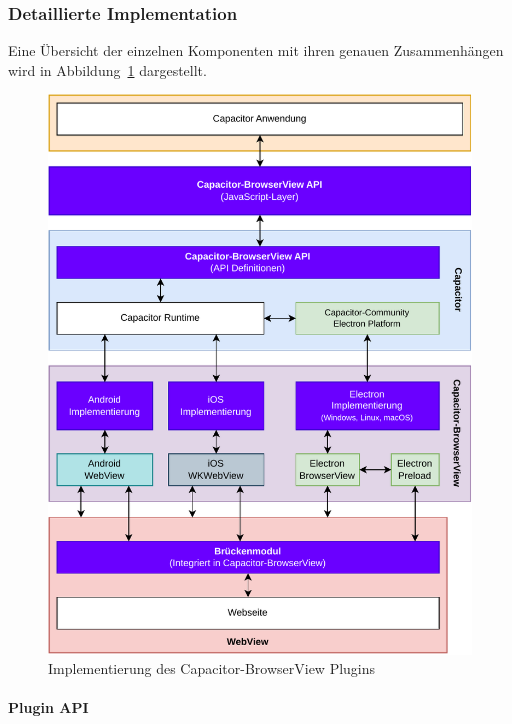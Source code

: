 \subsubsection{Detaillierte Implementation}

Eine Übersicht der einzelnen Komponenten mit ihren genauen Zusammenhängen wird in Abbildung~\ref{asset:Capacitor-BrowserView:Implementation} dargestellt.

\begin{figure}[H]
  \centering
  \vspace{1em}
  \includegraphics[width=\textwidth]{assets/03_Capacitor-BrowserView/03_Implementation.drawio.pdf}
  \caption[Capacitor-BrowserView / Implementierung]{Implementierung des Capacitor-BrowserView Plugins}
  \label{asset:Capacitor-BrowserView:Implementation}
\end{figure}

\newpage

\paragraph{Plugin API}


